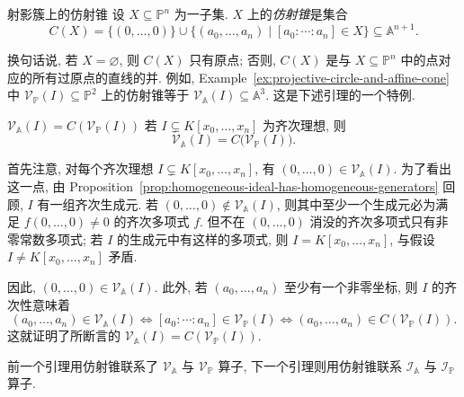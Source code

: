 \begin{Definition}{射影簇上的仿射锥}\leavevmode\label{def:affine-cone-over-projective-subset}
设 $X\subseteq\mathbb{P}^{n}$ 为一子集. $X$ 上的\emph{仿射锥}是集合
\[
  C(X)=\{(0,\ldots,0)\}\cup\{(a_{0},\ldots,a_{n})\mid[a_{0}:\cdots:a_{n}]\in X\}
  \subseteq\mathbb{A}^{n+1}.
\]
\end{Definition}

换句话说, 若 $X=\varnothing$, 则 $C(X)$ 只有原点; 否则, $C(X)$ 是与 $X\subseteq\mathbb{P}^{n}$ 中的点对应的所有过原点的直线的并. 例如, Example~\ref{ex:projective-circle-and-affine-cone} 中 $\mathcal{V}_{\mathbb{P}}(I)\subseteq\mathbb{P}^{2}$ 上的仿射锥等于 $\mathcal{V}_{\mathbb{A}}(I)\subseteq\mathbb{A}^{3}$. 这是下述引理的一个特例.

\begin{Lemma}{$\mathcal{V}_{\mathbb{A}}(I)=C(\mathcal{V}_{\mathbb{P}}(I))$}\leavevmode\label{lem:affine-vanishing-set-is-cone-of-projective-vanishing-set}
若 $I\subsetneq K[x_{0},\ldots,x_{n}]$ 为齐次理想, 则
\[
  \mathcal{V}_{\mathbb{A}}(I)=C\bigl(\mathcal{V}_{\mathbb{P}}(I)\bigr).
\]
\end{Lemma}
\begin{Proof}
首先注意, 对每个齐次理想 $I\subsetneq K[x_{0},\ldots,x_{n}]$, 有 $(0,\ldots,0)\in\mathcal{V}_{\mathbb{A}}(I)$. 为了看出这一点, 由 Proposition~\ref{prop:homogeneous-ideal-has-homogeneous-generators} 回顾, $I$ 有一组齐次生成元. 若 $(0,\ldots,0)\notin\mathcal{V}_{\mathbb{A}}(I)$, 则其中至少一个生成元必为满足 $f(0,\ldots,0)\ne0$ 的齐次多项式 $f$. 但不在 $(0,\ldots,0)$ 消没的齐次多项式只有非零常数多项式; 若 $I$ 的生成元中有这样的多项式, 则 $I=K[x_{0},\ldots,x_{n}]$, 与假设 $I\ne K[x_{0},\ldots,x_{n}]$ 矛盾.

因此, $(0,\ldots,0)\in\mathcal{V}_{\mathbb{A}}(I)$. 此外, 若 $(a_{0},\ldots,a_{n})$ 至少有一个非零坐标, 则 $I$ 的齐次性意味着
\[
  (a_{0},\ldots,a_{n})\in\mathcal{V}_{\mathbb{A}}(I)
  \iff[a_{0}:\cdots:a_{n}]\in\mathcal{V}_{\mathbb{P}}(I)
  \iff(a_{0},\ldots,a_{n})\in C(\mathcal{V}_{\mathbb{P}}(I)).
\]
这就证明了所断言的 $\mathcal{V}_{\mathbb{A}}(I)=C(\mathcal{V}_{\mathbb{P}}(I))$.
\end{Proof}

前一个引理用仿射锥联系了 $\mathcal{V}_{\mathbb{A}}$ 与 $\mathcal{V}_{\mathbb{P}}$ 算子, 下一个引理则用仿射锥联系 $\mathcal{I}_{\mathbb{A}}$ 与 $\mathcal{I}_{\mathbb{P}}$ 算子.

